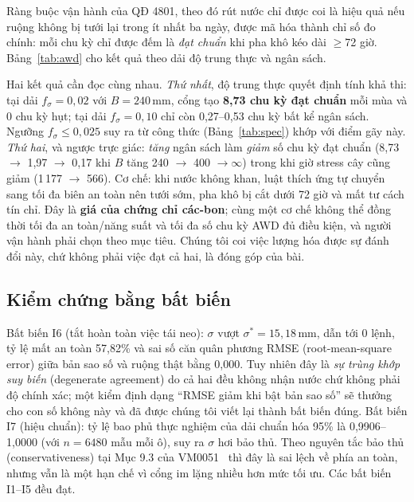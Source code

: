 \documentclass[10pt]{article}
\begin{document}
Ràng buộc vận hành của QĐ 4801, theo đó rút nước chỉ được coi là hiệu quả nếu ruộng không bị tưới lại trong ít nhất ba ngày, được mã hóa thành chỉ số đo chính: mỗi chu kỳ chỉ được đếm là \emph{đạt chuẩn} khi pha khô kéo dài $\ge$72 giờ. Bảng~\ref{tab:awd} cho kết quả theo dải độ trung thực và ngân sách.

\begin{table}[t]
\centering
\caption{Chu kỳ AWD đạt chuẩn $\ge$72 giờ (QĐ 4801); chính sách đề xuất, severe, 30 lần mô phỏng mỗi ô. ``Hụt chuẩn'' $=$ pha khô $<$72 giờ nên không được tính tín chỉ.}
\label{tab:awd}
\scriptsize

\end{table}

Hai kết quả cần đọc cùng nhau. \emph{Thứ nhất}, độ trung thực quyết định tính khả thi: tại dải $f_\sigma{=}0{,}02$ với $B{=}240$\,mm, cổng tạo \textbf{8,73 chu kỳ đạt chuẩn} mỗi mùa và 0 chu kỳ hụt; tại dải $f_\sigma{=}0{,}10$ chỉ còn 0,27--0,53 chu kỳ bất kể ngân sách. Ngưỡng $f_\sigma \le 0{,}025$ suy ra từ công thức (Bảng~\ref{tab:spec}) khớp với điểm gãy này. \emph{Thứ hai}, và ngược trực giác: \emph{tăng} ngân sách làm \emph{giảm} số chu kỳ đạt chuẩn (8,73 $\to$ 1,97 $\to$ 0,17 khi $B$ tăng 240 $\to$ 400 $\to \infty$) trong khi giờ stress cây cũng giảm (1\,177 $\to$ 566). Cơ chế: khi nước không khan, luật thích ứng tự chuyển sang tối đa biên an toàn nên tưới sớm, pha khô bị cắt dưới 72 giờ và mất tư cách tín chỉ. Đây là \textbf{giá của chứng chỉ các-bon}; cùng một cơ chế không thể đồng thời tối đa an toàn/năng suất và tối đa số chu kỳ AWD đủ điều kiện, và người vận hành phải chọn theo mục tiêu. Chúng tôi coi việc lượng hóa được sự đánh đổi này, chứ không phải việc đạt cả hai, là đóng góp của bài.

\subsection{Kiểm chứng bằng bất biến}
\label{sec:invariants}

Bất biến I6 (tắt hoàn toàn việc tái neo): $\sigma$ vượt $\sigma^{*}{=}15{,}18$\,mm, dẫn tới 0 lệnh, tỷ lệ mất an toàn 57,82\% và sai số căn quân phương RMSE (root-mean-square error) giữa bản sao số và ruộng thật bằng 0,000. Tuy nhiên đây là \emph{sự trùng khớp suy biến} (degenerate agreement) do cả hai đều không nhận nước chứ không phải độ chính xác; một kiểm định dạng ``RMSE giảm khi bật bản sao số'' sẽ thưởng cho con số không này và đã được chúng tôi viết lại thành bất biến đúng. Bất biến I7 (hiệu chuẩn): tỷ lệ bao phủ thực nghiệm của dải chuẩn hóa 95\% là 0,9906--1,0000 (với $n{=}6480$ mẫu mỗi ô), suy ra $\sigma$ hơi bảo thủ. Theo nguyên tắc bảo thủ (conservativeness) tại Mục 9.3 của VM0051~\cite{vm0051} thì đây là sai lệch về phía an toàn, nhưng vẫn là một hạn chế vì cổng im lặng nhiều hơn mức tối ưu. Các bất biến I1--I5 đều đạt.
\end{document}
